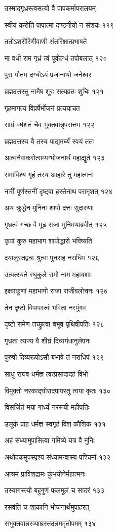 तस्माद्गृध्रस्त्वसत्यो वै पापकर्मापरालयम्

स्वीयं करोति पापात्मा दण्डनीयो न संशयः ११९

ततोऽशरीरिणीवाणी अंतरिक्षात्प्रभाषते

मा वधी राम गृध्रं त्वं पूर्वंदग्धं तपोबलात् १२०

पुरा गौतम दग्धोऽयं प्रजानाथो जनेश्वर

ब्रह्मदत्तस्तु नामैष शूरः सत्यव्रतः शुचिः १२१

गृहमागत्य विप्रर्षेर्भोजनं प्रत्ययाचत

साग्रं वर्षशतं चैव भुक्तवान्नृपसत्तम १२२

ब्रह्मदत्तस्य वै तस्य पाद्यमर्घ्यं स्वयं ततः

आत्मनैवाकरोत्सम्यग्भोजनार्थं महाद्युते १२३

समाविश्य गृहं तस्य आहारे तु महात्मनः

नारीं पूर्णस्तनीं दृष्ट्वा हस्तेनाथ परामृशत् १२४

अथ क्रुद्धेन मुनिना शापो दत्तः सुदारुणः

गृध्रत्वं गच्छ वै मूढ राजा मुनिमथाब्रवीत् १२५

कृपां कुरु महाभाग शापोद्धारो भविष्यति

दयालुस्तद्वचः श्रुत्वा पुनराह नराधिप १२६

उत्पत्स्यते रघुकुले रामो नाम महायशाः

इक्ष्वाकूणां महाभागो राजा राजीवलोचनः १२७

तेन दृष्टो विपापस्त्वं भविता नरपुंगव

दृष्टो रामेण तच्छ्रुत्वा बभूव पृथिवीपतिः १२८

गृध्रत्वं त्यज्य वै शीघ्रं दिव्यगंधानुलेपनः

पुरुषो दिव्यरूपोऽसौ बभाषे तं नराधिपं १२९

साधु राघव धर्मज्ञ त्वत्प्रसादादहं विभो

विमुक्तो नरकाद्घोरादपापस्तु त्वया कृतः १३०

विसर्जितं मया गार्ध्यं नररूपी महीपतिः

उलूकं प्राह धर्मज्ञ स्वगृहं विश कौशिक १३१

अहं संध्यामुपासित्वा गमिष्ये यत्र वै मुनिः

अथोदकमुपस्पृश्य संध्यामन्वास्य पश्चिमां १३२

आश्रमं प्राविशद्रामः कुंभयोनेर्महात्मनः

तस्यागस्त्यो बहुगुणं फलमूलं च सादरं १३३

रसवंति च शाकानि भोजनार्थमुपाहरत्

सभुक्तवान्नरव्याघ्रस्तदन्नममृतोपमम् १३४

